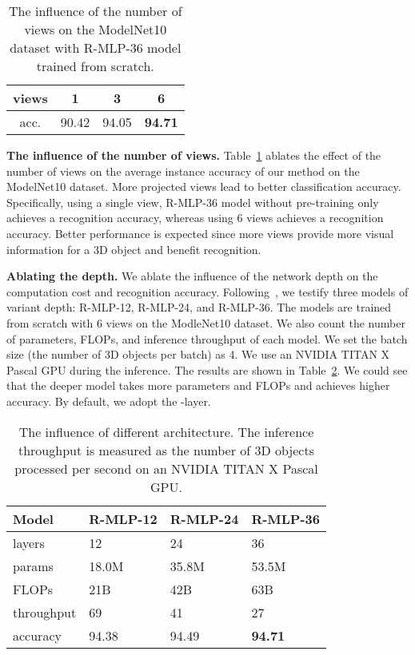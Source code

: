 \documentclass[11pt]{article}
\begin{document}
\begin{table}[h]
\caption{The influence of the number of views on the ModelNet10 dataset with R-MLP-36 model trained from scratch.}
\label{tab:view}
\centering
\begin{tabular}{cccc}
\toprule
views & 1 & 3 & 6 \\
\midrule
acc. & 90.42 & 94.05 & \textbf{94.71} \\
\bottomrule
\end{tabular}
\end{table}



\vspace{0.2in}\noindent\textbf{The influence of the number of views.} Table~\ref{tab:view} ablates the effect of the number of views on the average instance accuracy of our method on the ModelNet10 dataset. More projected views lead to better classification accuracy. Specifically, using a single view, R-MLP-36 model without pre-training only achieves a  recognition accuracy, whereas using 6 views achieves a  recognition accuracy. Better performance is expected since more views provide more visual information for a 3D object and benefit recognition.

\vspace{0.2in}\noindent\textbf{Ablating the depth.}
We ablate the influence of the network depth on the computation cost and recognition accuracy. Following~\citep{yu2022s2mlp}, we testify three models of variant depth: R-MLP-12, R-MLP-24, and R-MLP-36.
The models are trained from scratch with 6 views on the ModleNet10 dataset. We also count the number of parameters, FLOPs, and inference throughput of each model. We set the batch size (the number of 3D objects per batch) as 4. We use an NVIDIA TITAN X Pascal GPU during the inference. The results are shown in Table~\ref{tab:arch}. We could see that the deeper model takes more parameters and FLOPs and achieves higher accuracy. By default, we adopt the -layer.

\begin{table}[h]
\caption{The influence of different architecture. The inference throughput is measured as the number of 3D objects processed per second on an NVIDIA TITAN X Pascal GPU.}\label{tab:arch}
\centering
\begin{tabular}{llll}
\toprule
Model & R-MLP-12 & R-MLP-24 & R-MLP-36 \\
\midrule
layers & 12 & 24 & 36 \\
params & 18.0M & 35.8M & 53.5M \\
FLOPs & 21B & 42B & 63B \\
throughput & 69 & 41 & 27 \\
accuracy & 94.38 & 94.49 & \textbf{94.71} \\
\bottomrule
\end{tabular}
\end{table}
\end{document}

